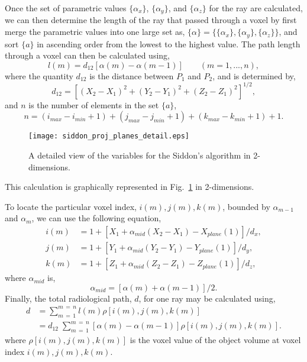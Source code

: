 Once the set of parametric values $\{\alpha_x\}$, $\{\alpha_y\}$, and $\{\alpha_z\}$ for the ray are calculated, we can then determine the length of the ray that passed through a voxel by first merge the parametric values into one large set as, $\{ \alpha \}  = \{ \{\alpha_x\}, \{\alpha_y\}, \{\alpha_z\} \}$, and sort $\{ a \}$ in ascending order from the lowest to the highest value.  The path length through a voxel can then be calculated using, 
%
\begin{equation}
l(m) = d_{12} \left[ \alpha(m) - \alpha(m-1) \right] \qquad (m = 1, ..., n),
\label{eq:siddon_length}
\end{equation}
%
where the quantity $d_{12}$ is the distance between $P_1$ and $P_2$, and is determined by,
%
\begin{equation}
d_{12} = \left[ (X_2 - X_1)^2 + (Y_2 - Y_1)^2 + (Z_2 - Z_1)^2 \right]^{1/2}, 
\label{eq:siddon_d12}
\end{equation}
%
and $n$ is the number of elements in the set $\{ a \}$,
%
\begin{equation}
n = (i_{max} - i_{min} + 1) + (j_{max} - j_{min}+1) + (k_{max}-k_{min}+1) + 1.
\label{eq:siddon_n}
\end{equation}
%
\begin{figure}[ht]
\centering
\texttt{[image: siddon\_proj\_planes\_detail.eps]}
\caption{A detailed view of the variables for the Siddon's algorithm in 2-dimensions.}
\label{fig:siddon_plane_detail}
\end{figure}
%
This calculation is graphically represented in Fig.~\ref{fig:siddon_plane_detail} in 2-dimensions.

To locate the particular voxel index, $i(m), j(m), k(m)$, bounded by $\alpha_{m-1}$ and $\alpha_m$, we can use the following equation,
\begin{equation}
\begin{aligned}
i(m) &= 1 + \left[ X_1 + \alpha_{mid}(X_2 - X_1) - X_{plane}(1) \right] /d_x, \\
j(m) &= 1 + \left[ Y_1 + \alpha_{mid}(Y_2 - Y_1) - Y_{plane}(1) \right] /d_y, \\
k(m) &= 1 + \left[ Z_1 + \alpha_{mid}(Z_2 - Z_1) - Z_{plane}(1) \right] /d_z,
\end{aligned}
\label{eq:siddon_voxel}
\end{equation}
where $\alpha_{mid}$ is,
\begin{equation}
\alpha_{mid} = \left[ \alpha(m) + \alpha(m-1) \right] /2.
\label{eq:siddon_alphamid}
\end{equation}
%
Finally, the total radiological path, $d$, for one ray may be calculated using,
%
\begin{equation}
\begin{aligned}
d &= \sum\limits_{m \, = \, 1}^{m \, = \, n} l(m) \rho\left[ i(m), j(m), k(m) \right] \\
  &= d_{12} \; \sum\limits_{m \, = \, 1}^{m \, = \, n} \left[ \alpha(m) - \alpha(m-1) \right] \rho \left[ i(m), j(m), k(m) \right].
\end{aligned}
\label{eq:siddon_path}
\end{equation}
%
where $\rho \left[ i(m), j(m), k(m) \right]$ is the voxel value of the object volume at voxel index $i(m), j(m), k(m)$.

